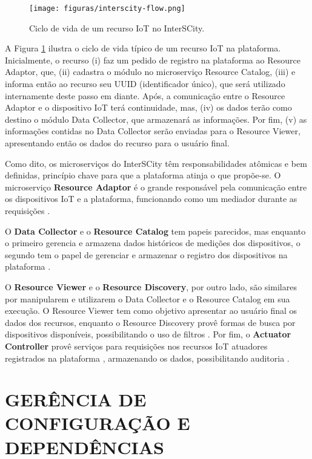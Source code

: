 \begin{figure}
  \centering
    \texttt{[image: figuras/interscity-flow.png]}
  \caption{Ciclo de vida de um recurso IoT no InterSCity.}
  \label{fig:interscity-lifecycle}
\end{figure}

A Figura \ref{fig:interscity-lifecycle} ilustra o ciclo de vida típico de um
recurso IoT na plataforma. Inicialmente, o recurso (i) faz um pedido de
registro na plataforma ao Resource Adaptor, que, (ii) cadastra o módulo no
microserviço Resource Catalog, (iii) e informa então ao recurso seu UUID
(identificador único), que será utilizado internamente deste passo em diante.
Após, a comunicação entre o Resource Adaptor e o dispositivo IoT terá
continuidade, mas, (iv) os dados terão como destino o módulo Data Collector,
que armazenará as informações. Por fim, (v) as informações contidas no
Data Collector serão enviadas para o Resource Viewer, apresentando então os
dados do recurso para o usuário final.

Como dito, os microserviços do InterSCity têm responsabilidades atômicas e bem
definidas, princípio chave para que a plataforma atinja o que propõe-se. O
microserviço \textbf{Resource Adaptor} é o grande responsável pela comunicação
entre os dispositivos IoT e a plataforma, funcionando como um mediador
durante as requisições \cite{delesposte2017}.

O \textbf{Data Collector} e o \textbf{Resource Catalog} tem papeis parecidos,
mas enquanto o primeiro gerencia e armazena dados históricos de medições dos
dispositivos, o segundo tem o papel de gerenciar e armazenar o registro dos
dispositivos na plataforma \cite{delesposte2017}.

O \textbf{Resource Viewer} e o \textbf{Resource Discovery}, por outro lado,
são similares por manipularem e utilizarem o Data Collector e o Resource
Catalog em sua execução. O Resource Viewer tem como objetivo apresentar ao
usuário final os dados dos recursos, enquanto o Resource Discovery provê formas
de busca por dispositivos disponíveis, possibilitando o uso de filtros
\cite{delesposte2017}. Por fim, o \textbf{Actuator Controller} provê serviços
para requisições nos recursos IoT atuadores registrados na plataforma
, armazenando os dados, possibilitando auditoria
\cite{delesposte2017}.

\section{GERÊNCIA DE CONFIGURAÇÃO E DEPENDÊNCIAS}

